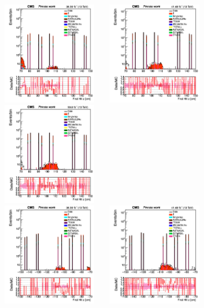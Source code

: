 \documentclass{cernatlasnote}
\begin{document}
 \begin{figure}[htp]
\centering

 \includegraphics[width=4.6cm, height=4.4cm]{images/emu_channel/2016/16_Plots_for_r_z/track_Track_firstHit_z_TRK_etaGT1p5_zGT70_Log.png}
\includegraphics[width=4.6cm, height=4.4cm]{images/emu_channel/2017/17_Plots_for_r_z/track_Track_firstHit_z_TRK_etaGT1p5_zGT70_Log.png}
 \includegraphics[width=4.6cm, height=4.4cm]{images/emu_channel/2018/18_Plots_for_r_z/track_Track_firstHit_z_TRK_etaGT1p5_zGT70_Log.png}\\
\includegraphics[width=4.6cm, height=4.4cm]{images/emu_channel/2016/16_Plots_for_r_z/track_Track_firstHit_z_TRK_etaGT1p5_zGT70_minus_Log.png}
\includegraphics[width=4.6cm, height=4.4cm]{images/emu_channel/2017/17_Plots_for_r_z/track_Track_firstHit_z_TRK_etaGT1p5_zGT70_minus_Log.png}

\end{figure}
\end{document}
